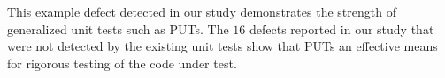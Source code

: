 This example defect detected in our study demonstrates the strength of generalized unit tests such as PUTs. The $16$ defects reported in our study that were not detected by the existing unit tests show that PUTs an effective means for rigorous testing of the code under test.  
%
%
